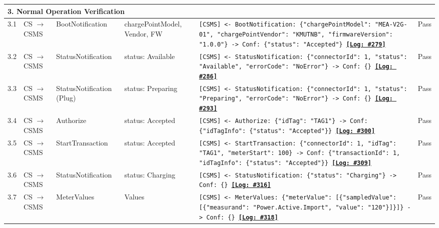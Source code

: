 \documentclass[10pt, a4paper, landscape]{article}
\begin{document}
\begin{longtable}{|p{1.0cm}|p{2.5cm}|p{4.0cm}|p{5.0cm}|p{10.0cm}|c|}
\multicolumn{6}{|l|}{\cellcolor{blue!10}\textbf{3. Normal Operation Verification}} \\
\hline
3.1 & CS $\to$ CSMS & BootNotification & chargePointModel, Vendor, FW & \footnotesize\texttt{[CSMS] <- BootNotification: \{"chargePointModel": "MEA-V2G-01", "chargePointVendor": "KMUTNB", "firmwareVersion": "1.0.0"\} \newline [CSMS] -> Conf: \{"status": "Accepted"\} \newline \hyperref[log:3.1]{\textbf{[Log: \#279]}}} & Pass \\
\hline
3.2 & CS $\to$ CSMS & StatusNotification & status: Available & \footnotesize\texttt{[CSMS] <- StatusNotification: \{"connectorId": 1, "status": "Available", "errorCode": "NoError"\} \newline [CSMS] -> Conf: \{\} \newline \hyperref[log:3.2]{\textbf{[Log: \#286]}}} & Pass \\
\hline
3.3 & CS $\to$ CSMS & StatusNotification (Plug) & status: Preparing & \footnotesize\texttt{[CSMS] <- StatusNotification: \{"connectorId": 1, "status": "Preparing", "errorCode": "NoError"\} \newline [CSMS] -> Conf: \{\} \newline \hyperref[log:3.3]{\textbf{[Log: \#293]}}} & Pass \\
\hline
3.4 & CS $\to$ CSMS & Authorize & status: Accepted & \footnotesize\texttt{[CSMS] <- Authorize: \{"idTag": "TAG1"\} \newline [CSMS] -> Conf: \{"idTagInfo": \{"status": "Accepted"\}\} \newline \hyperref[log:3.4]{\textbf{[Log: \#300]}}} & Pass \\
\hline
3.5 & CS $\to$ CSMS & StartTransaction & status: Accepted & \footnotesize\texttt{[CSMS] <- StartTransaction: \{"connectorId": 1, "idTag": "TAG1", "meterStart": 100\} \newline [CSMS] -> Conf: \{"transactionId": 1, "idTagInfo": \{"status": "Accepted"\}\} \newline \hyperref[log:3.5]{\textbf{[Log: \#309]}}} & Pass \\
\hline
3.6 & CS $\to$ CSMS & StatusNotification & status: Charging & \footnotesize\texttt{[CSMS] <- StatusNotification: \{"status": "Charging"\} \newline [CSMS] -> Conf: \{\} \newline \hyperref[log:3.6]{\textbf{[Log: \#316]}}} & Pass \\
\hline
3.7 & CS $\to$ CSMS & MeterValues & Values & \footnotesize\texttt{[CSMS] <- MeterValues: \{"meterValue": [\{"sampledValue": [\{"measurand": "Power.Active.Import", "value": "120"\}]\}]\} \newline [CSMS] -> Conf: \{\} \newline \hyperref[log:3.7]{\textbf{[Log: \#318]}}} & Pass \\

\end{longtable}
\end{document}
